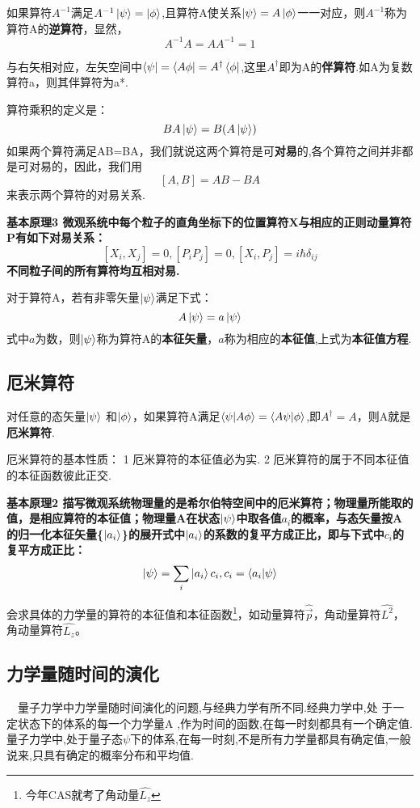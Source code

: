 \documentclass[13pt,a4paper]{article}
\begin{document}
\begin{CJK}{UTF8}{song}
如果算符$A^{-1}$满足$A^{-1}\ket{\psi}=\ket{\phi}$,且算符A使关系$\ket{\psi}=A\ket{\phi}$一一对应，则$A^{-1}$称为算符A的\textbf{逆算符}，显然，$$A^{-1}A=AA^{-1}=1$$

与右矢相对应，左矢空间中$\bra{\psi}=\bra{A\phi}=A^{\dagger}\bra{\phi}$,这里$A^{\dagger}$即为A的\textbf{伴算符}.如A为复数算符a，则其伴算符为a*.

算符乘积的定义是：$$BA\ket{\psi}=B(A\ket{\psi})$$如果两个算符满足AB=BA，我们就说这两个算符是可\textbf{对易}的,各个算符之间并非都是可对易的，因此，我们用$$[A,B]=AB-BA$$来表示两个算符的对易关系.

\textbf{基本原理3 微观系统中每个粒子的直角坐标下的位置算符X与相应的正则动量算符P有如下对易关系：$$[X_i,X_j]=0,[P_iP_j]=0,[X_i,P_j]=i\hbar\delta_{ij}$$不同粒子间的所有算符均互相对易.}

对于算符A，若有非零矢量$\ket{\psi}$满足下式：$$A\ket{\psi}=a\ket{\psi}$$式中$a$为数，则$\ket{\psi}$称为算符A的\textbf{本征矢量}，$a$称为相应的\textbf{本征值},上式为\textbf{本征值方程}.

\subsection{厄米算符}
对任意的态矢量$\ket{\psi}$ 和$\ket{\phi}$，如果算符A满足$\braket{\psi|A\phi}=\braket{A\psi|\phi}$,即$A^\dagger=A$，则A就是\textbf{厄米算符}.

厄米算符的基本性质：
1 厄米算符的本征值必为实.
2 厄米算符的属于不同本征值的本征函数彼此正交.

\textbf{基本原理2  描写微观系统物理量的是希尔伯特空间中的厄米算符；物理量所能取的值，是相应算符的本征值；物理量A在状态$\ket{\psi}$中取各值$a_i$的概率，与态矢量按A的归一化本征矢量\{$\ket{a_i}$\}的展开式中$\ket{a_i}$的系数的复平方成正比，即与下式中$c_i$的复平方成正比：$$\ket{\psi}=\sum_i\ket{a_i}c_i,c_i=\braket{a_i|\psi}$$}

会求具体的力学量的算符的本征值和本征函数\footnote{今年CAS就考了角动量$\hat{L_z}$}，如动量算符$\hat{\vec{p}}$，角动量算符$\hat{L^2}$，角动量算符$\hat{L_z}$。


\subsection{力学量随时间的演化}
\ \ 量子力学中力学量随时间演化的问题,与经典力学有所不同.经典力学中,处
于一定状态下的体系的每一个力学量A ,作为时间的函数,在每一时刻都具有一个确定值.量子力学中,处于量子态$\psi$下的体系,在每一时刻,不是所有力学量都具有确定值,一般说来,只具有确定的概率分布和平均值.


\end{CJK}
\end{document}
